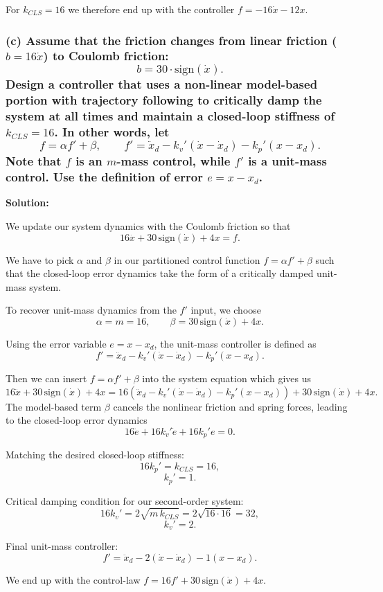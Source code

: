 \documentclass[a4paper,12pt]{article}
\begin{document}
For \(k_{CLS}=16\) we therefore end up with the controller $f = -16\dot{x} - 12x$.


\subsubsection*{(c) Assume that the friction changes from linear friction ($b = 16\dot{x}$) to Coulomb friction:\[b = 30 \cdot \text{sign}(\dot{x}).\]
Design a controller that uses a non-linear model-based portion with trajectory following to critically damp the system at all times and maintain a closed-loop stiffness of $k_{CLS} = 16$.  
In other words, let
\[f = \alpha f' + \beta,
\qquad
f' = \ddot{x}_d - k_v' (\dot{x} - \dot{x}_d) - k_p' (x - x_d).
\]
Note that $f$ is an $m$-mass control, while $f'$ is a unit-mass control.  
Use the definition of error $e = x - x_d$.}  
\textbf{Solution:}

We update our system dynamics with the Coulomb friction so that
\[
16\ddot{x} + 30\,\mathrm{sign}(\dot{x}) + 4x = f.
\]

We have to pick $\alpha$ and $\beta$ in our partitioned control function $f=\alpha f' + \beta$ such that the closed-loop error dynamics take the form of a critically damped unit-mass system.

To recover unit-mass dynamics from the $f'$ input, we choose
\[
\alpha = m = 16,
\qquad
\beta = 30\,\mathrm{sign}(\dot{x}) + 4x.
\]

Using the error variable $e = x - x_d$, the unit-mass controller is defined as
\[
f' = \ddot{x}_d - k_v'(\dot{x}-\dot{x}_d) - k_p'(x-x_d).
\]

Then we can insert $f = \alpha f' + \beta$ into the system equation which gives us
\[
16\ddot{x} + 30\,\mathrm{sign}(\dot{x}) + 4x
=
16\!\left( 
\ddot{x}_d - k_v'(\dot{x}-\dot{x}_d) - k_p'(x-x_d)
\right)
+ 30\,\mathrm{sign}(\dot{x}) + 4x.
\]
The model-based term $\beta$ cancels the nonlinear friction and spring forces, leading to the closed-loop error dynamics
\[
16\ddot{e} + 16k_v'\dot{e} + 16k_p' e = 0.
\]

Matching the desired closed-loop stiffness:
\[
16k_p' = k_{CLS} = 16,
\]
\[
k_p' = 1.
\]

Critical damping condition for our second-order system:
\[
16k_v' = 2\sqrt{m\,k_{CLS}}
        = 2\sqrt{16\cdot 16}
        = 32,
\]
\[
k_v' = 2.
\]

Final unit-mass controller:
\[
f' = \ddot{x}_d - 2(\dot{x} - \dot{x}_d) - 1(x - x_d).
\]

We end up with the control-law $f = 16 f' + 30\,\mathrm{sign}(\dot{x}) + 4x$.
\end{document}
